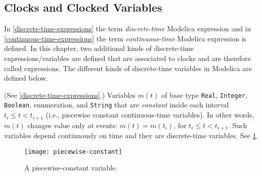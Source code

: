 \subsection{Clocks and Clocked Variables}\label{clocks-and-clocked-variables}


In \cref{discrete-time-expressions} the term \emph{discrete-time} Modelica expression and in \cref{continuous-time-expressions} the term \emph{continuous-time} Modelica expression is defined.
In this chapter, two additional kinds of discrete-time expressions/variables are defined that are associated to clocks and are therefore called  expressions.
The different kinds of discrete-time variables in Modelica are defined below.

\begin{definition}
(See \cref{discrete-time-expressions}.)  Variables $m(t)$ of base type \lstinline!Real!, \lstinline!Integer!, \lstinline!Boolean!, enumeration, and \lstinline!String! that are
\emph{constant} inside each interval $t_{i} \leq t < t_{i+1}$ (i.e., piecewise constant continuous-time variables).  In other words, $m(t)$ changes
value only at events: $m(t) = m(t_{i})$, for $t_{i} \leq t < t_{i+1}$.  Such variables depend continuously on time and they are discrete-time variables.
See \cref{fig:piecewise-constant-variable}.
\end{definition}

\begin{figure}[H]
  \begin{center}
    \texttt{[image: piecewise-constant]}
  \end{center}
  \caption{A piecewise-constant variable.}\label{fig:piecewise-constant-variable}
\end{figure}

